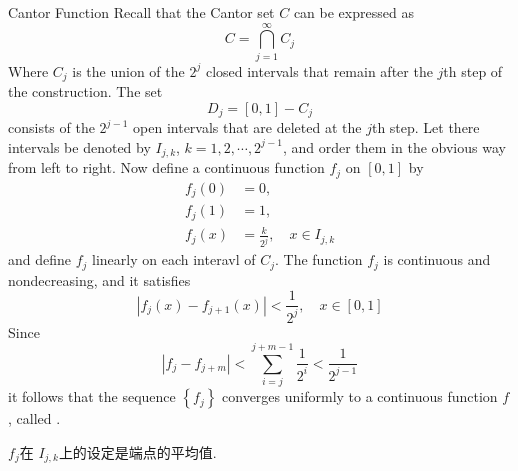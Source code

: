 \documentclass[../main.tex]{subfiles}
\begin{document}
\begin{definition}{Cantor Function}{}
    Recall that the Cantor set \(  C  \) can be expressed as \[
    C= \bigcap _{j= 1}^{\infty}C_{j}
    \] Where \(  C_{j}  \) is the union of the \(  2^{j}  \) closed intervals that remain after the \(  j  \)th step of the construction. The set \[
    D_{j}= \left[ 0,1 \right]-C_{j} 
    \]consists of the \(  2^{j-1}  \)    open intervals that are deleted at the \(  j  \)th step. Let there intervals be denoted by \(  I_{j,k}  \), \(  k= 1,2,\cdots ,2^{j-1}  \), and order them in the obvious way from left to right.   Now define a continuous function \(  f_{j}  \) on \(  \left[ 0,1 \right]   \) by \[
    \begin{aligned}
    f_{j}\left( 0 \right)&= 0,\\ 
     f_{j}\left( 1 \right)&= 1,\\ 
      f_{j}\left( x \right)&= \frac{k }{2^{j} },\quad  x \in I_{j,k}  
    \end{aligned}
    \]  and define \(  f_{j}   \) linearly on each interavl of \(  C_{j}  \). The function \(  f_{j}  \) is continuous and nondecreasing, and it satisfies \[
    \left| f_{j}\left( x \right)-f_{j + 1}\left( x \right)   \right|< \frac{1 }{2^{j} },\quad x \in \left[ 0,1 \right]   
    \]   Since \[
    \left| f_{j}-f_{j + m} \right|< \sum _{i= j}^{j + m-1}\frac{1 }{2^{i} }< \frac{1 }{2^{j-1} }   
    \] it follows that the sequence \(  \left\{ f_{j} \right\}  \) converges uniformly to a continuous function \(  f  \), called .   
\end{definition}
\begin{note}
    \(  f_{j}  \)在 \(  I_{j,k}  \)上的设定是端点的平均值.  
\end{note}
\end{document}
